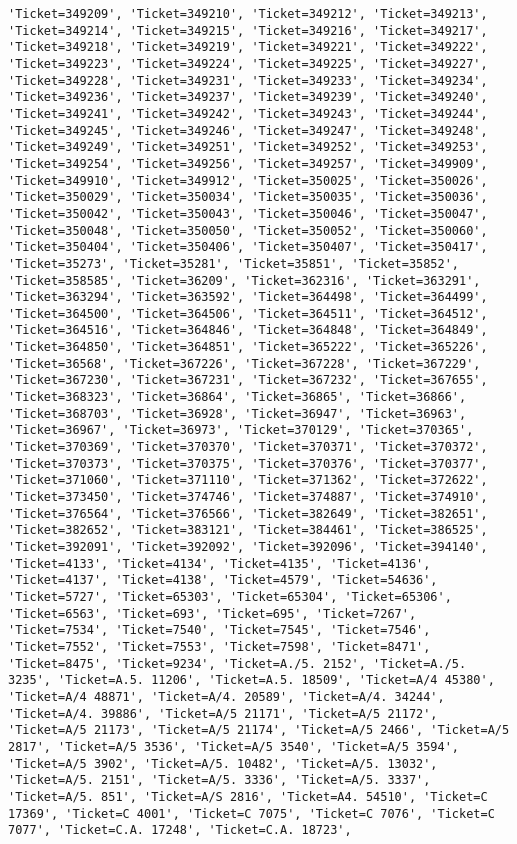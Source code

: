 \documentclass[11pt]{article}
\begin{document}
\begin{Verbatim}[commandchars=\\\{\}]
'Ticket=349209', 'Ticket=349210', 'Ticket=349212', 'Ticket=349213', 'Ticket=349214', 'Ticket=349215', 'Ticket=349216', 'Ticket=349217', 'Ticket=349218', 'Ticket=349219', 'Ticket=349221', 'Ticket=349222', 'Ticket=349223', 'Ticket=349224', 'Ticket=349225', 'Ticket=349227', 'Ticket=349228', 'Ticket=349231', 'Ticket=349233', 'Ticket=349234', 'Ticket=349236', 'Ticket=349237', 'Ticket=349239', 'Ticket=349240', 'Ticket=349241', 'Ticket=349242', 'Ticket=349243', 'Ticket=349244', 'Ticket=349245', 'Ticket=349246', 'Ticket=349247', 'Ticket=349248', 'Ticket=349249', 'Ticket=349251', 'Ticket=349252', 'Ticket=349253', 'Ticket=349254', 'Ticket=349256', 'Ticket=349257', 'Ticket=349909', 'Ticket=349910', 'Ticket=349912', 'Ticket=350025', 'Ticket=350026', 'Ticket=350029', 'Ticket=350034', 'Ticket=350035', 'Ticket=350036', 'Ticket=350042', 'Ticket=350043', 'Ticket=350046', 'Ticket=350047', 'Ticket=350048', 'Ticket=350050', 'Ticket=350052', 'Ticket=350060', 'Ticket=350404', 'Ticket=350406', 'Ticket=350407', 'Ticket=350417', 'Ticket=35273', 'Ticket=35281', 'Ticket=35851', 'Ticket=35852', 'Ticket=358585', 'Ticket=36209', 'Ticket=362316', 'Ticket=363291', 'Ticket=363294', 'Ticket=363592', 'Ticket=364498', 'Ticket=364499', 'Ticket=364500', 'Ticket=364506', 'Ticket=364511', 'Ticket=364512', 'Ticket=364516', 'Ticket=364846', 'Ticket=364848', 'Ticket=364849', 'Ticket=364850', 'Ticket=364851', 'Ticket=365222', 'Ticket=365226', 'Ticket=36568', 'Ticket=367226', 'Ticket=367228', 'Ticket=367229', 'Ticket=367230', 'Ticket=367231', 'Ticket=367232', 'Ticket=367655', 'Ticket=368323', 'Ticket=36864', 'Ticket=36865', 'Ticket=36866', 'Ticket=368703', 'Ticket=36928', 'Ticket=36947', 'Ticket=36963', 'Ticket=36967', 'Ticket=36973', 'Ticket=370129', 'Ticket=370365', 'Ticket=370369', 'Ticket=370370', 'Ticket=370371', 'Ticket=370372', 'Ticket=370373', 'Ticket=370375', 'Ticket=370376', 'Ticket=370377', 'Ticket=371060', 'Ticket=371110', 'Ticket=371362', 'Ticket=372622', 'Ticket=373450', 'Ticket=374746', 'Ticket=374887', 'Ticket=374910', 'Ticket=376564', 'Ticket=376566', 'Ticket=382649', 'Ticket=382651', 'Ticket=382652', 'Ticket=383121', 'Ticket=384461', 'Ticket=386525', 'Ticket=392091', 'Ticket=392092', 'Ticket=392096', 'Ticket=394140', 'Ticket=4133', 'Ticket=4134', 'Ticket=4135', 'Ticket=4136', 'Ticket=4137', 'Ticket=4138', 'Ticket=4579', 'Ticket=54636', 'Ticket=5727', 'Ticket=65303', 'Ticket=65304', 'Ticket=65306', 'Ticket=6563', 'Ticket=693', 'Ticket=695', 'Ticket=7267', 'Ticket=7534', 'Ticket=7540', 'Ticket=7545', 'Ticket=7546', 'Ticket=7552', 'Ticket=7553', 'Ticket=7598', 'Ticket=8471', 'Ticket=8475', 'Ticket=9234', 'Ticket=A./5. 2152', 'Ticket=A./5. 3235', 'Ticket=A.5. 11206', 'Ticket=A.5. 18509', 'Ticket=A/4 45380', 'Ticket=A/4 48871', 'Ticket=A/4. 20589', 'Ticket=A/4. 34244', 'Ticket=A/4. 39886', 'Ticket=A/5 21171', 'Ticket=A/5 21172', 'Ticket=A/5 21173', 'Ticket=A/5 21174', 'Ticket=A/5 2466', 'Ticket=A/5 2817', 'Ticket=A/5 3536', 'Ticket=A/5 3540', 'Ticket=A/5 3594', 'Ticket=A/5 3902', 'Ticket=A/5. 10482', 'Ticket=A/5. 13032', 'Ticket=A/5. 2151', 'Ticket=A/5. 3336', 'Ticket=A/5. 3337', 'Ticket=A/5. 851', 'Ticket=A/S 2816', 'Ticket=A4. 54510', 'Ticket=C 17369', 'Ticket=C 4001', 'Ticket=C 7075', 'Ticket=C 7076', 'Ticket=C 7077', 'Ticket=C.A. 17248', 'Ticket=C.A. 18723', 
\end{Verbatim}
\end{document}

